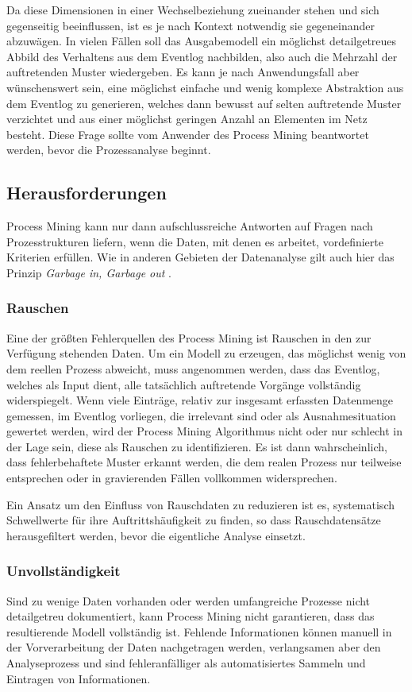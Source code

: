 Da diese Dimensionen in einer Wechselbeziehung zueinander stehen und sich gegenseitig beeinflussen, ist es je nach Kontext notwendig sie gegeneinander abzuwägen. In vielen Fällen soll das Ausgabemodell ein möglichst detailgetreues Abbild des Verhaltens aus dem Eventlog nachbilden, also auch die Mehrzahl der auftretenden Muster wiedergeben. 
Es kann je nach Anwendungsfall aber wünschenswert sein, eine möglichst einfache und wenig komplexe Abstraktion aus dem Eventlog zu generieren, welches dann bewusst auf selten auftretende Muster verzichtet und aus einer möglichst geringen Anzahl an Elementen im Netz besteht. Diese Frage sollte vom Anwender des Process Mining beantwortet werden, bevor die Prozessanalyse beginnt.

\subsection{Herausforderungen}\label{challanges}
Process Mining kann nur dann aufschlussreiche Antworten auf Fragen nach Prozesstrukturen liefern, wenn die Daten, mit denen es arbeitet, vordefinierte Kriterien erfüllen. Wie in anderen Gebieten der Datenanalyse gilt auch hier das Prinzip \textit{Garbage in, Garbage out} \cite{GIGO}. 

\subsubsection{Rauschen}
Eine der größten Fehlerquellen des Process Mining ist Rauschen in den zur Verfügung stehenden Daten. Um ein Modell zu erzeugen, das möglichst wenig von dem reellen Prozess abweicht, muss angenommen werden, dass das Eventlog, welches als Input dient, alle tatsächlich auftretende Vorgänge vollständig widerspiegelt. Wenn viele Einträge, relativ zur insgesamt erfassten Datenmenge gemessen, im Eventlog vorliegen, die irrelevant sind oder als Ausnahmesituation gewertet werden, wird der Process Mining Algorithmus nicht oder nur schlecht in der Lage sein, diese als Rauschen zu identifizieren. Es ist dann wahrscheinlich, dass fehlerbehaftete Muster erkannt werden, die dem realen Prozess nur teilweise entsprechen oder in gravierenden Fällen vollkommen widersprechen.

Ein Ansatz um den Einfluss von Rauschdaten zu reduzieren ist es, systematisch Schwellwerte für ihre Auftrittshäufigkeit zu finden, so dass Rauschdatensätze herausgefiltert werden, bevor die eigentliche Analyse einsetzt. 

\subsubsection{Unvollständigkeit}
Sind zu wenige Daten vorhanden oder werden umfangreiche Prozesse nicht detailgetreu dokumentiert, kann Process Mining nicht garantieren, dass das resultierende Modell vollständig ist. 
Fehlende Informationen können manuell in der Vorverarbeitung der Daten nachgetragen werden, verlangsamen aber den Analyseprozess und sind fehleranfälliger als automatisiertes Sammeln und Eintragen von Informationen. 

